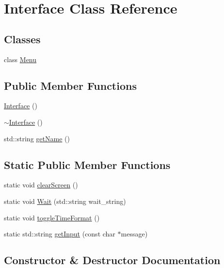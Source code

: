 \hypertarget{classInterface}{}\section{Interface Class Reference}
\label{classInterface}
\subsection*{Classes}
\begin{DoxyCompactItemize}
\item 
class \hyperlink{classInterface_1_1Menu}{Menu}
\end{DoxyCompactItemize}
\subsection*{Public Member Functions}
\begin{DoxyCompactItemize}
\item 
\hyperlink{classInterface_a4406d74c75bdfe150bf72be1f1cda8b1}{Interface} ()
\item 
\hyperlink{classInterface_a19179888f29f18f1be54a3dfe98f68c0}{$\sim$\+Interface} ()
\item 
std\+::string \hyperlink{classInterface_a73eee93e24c223cd265b5fb0ca1640b8}{get\+Name} ()
\end{DoxyCompactItemize}
\subsection*{Static Public Member Functions}
\begin{DoxyCompactItemize}
\item 
static void \hyperlink{classInterface_af92bb2aeecc6a19095af23fa78b49451}{clear\+Screen} ()
\item 
static void \hyperlink{classInterface_ab235ba2f0184e3fbfd5d5a64d5eb85ef}{Wait} (std\+::string wait\+\_\+string)
\item 
static void \hyperlink{classInterface_a2e002e61dc11cf4a1bd9c039704194df}{toggle\+Time\+Format} ()
\item 
static std\+::string \hyperlink{classInterface_aa5c0539404373d488986f030f7a84a6f}{get\+Input} (const char $\ast$message)
\end{DoxyCompactItemize}


\subsection{Constructor \& Destructor Documentation}
\mbox{\label{classInterface_a4406d74c75bdfe150bf72be1f1cda8b1}} 
